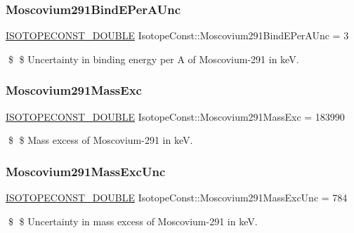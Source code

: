 \subsubsection{\texorpdfstring{Moscovium291\+Bind\+E\+Per\+A\+Unc}{Moscovium291BindEPerAUnc}}
{\footnotesize\ttfamily \mbox{\hyperlink{group___isotope_const-_macros_ga8f45a7272ce02c0b4c65c44636ed719a}{I\+S\+O\+T\+O\+P\+E\+C\+O\+N\+S\+T\+\_\+\+D\+O\+U\+B\+LE}} Isotope\+Const\+::\+Moscovium291\+Bind\+E\+Per\+A\+Unc = 3}

\$ \$ Uncertainty in binding energy per A of Moscovium-\/291 in keV. \mbox{\label{group___isotope_const-_moscovium-_mc291_ga5de9e2df6278844fd7f9e5b5e7cfc997}} 
\subsubsection{\texorpdfstring{Moscovium291\+Mass\+Exc}{Moscovium291MassExc}}
{\footnotesize\ttfamily \mbox{\hyperlink{group___isotope_const-_macros_ga8f45a7272ce02c0b4c65c44636ed719a}{I\+S\+O\+T\+O\+P\+E\+C\+O\+N\+S\+T\+\_\+\+D\+O\+U\+B\+LE}} Isotope\+Const\+::\+Moscovium291\+Mass\+Exc = 183990}

\$ \$ Mass excess of Moscovium-\/291 in keV. \mbox{\label{group___isotope_const-_moscovium-_mc291_ga3d97a3c2f9f0782c5a9455246d57619f}} 
\subsubsection{\texorpdfstring{Moscovium291\+Mass\+Exc\+Unc}{Moscovium291MassExcUnc}}
{\footnotesize\ttfamily \mbox{\hyperlink{group___isotope_const-_macros_ga8f45a7272ce02c0b4c65c44636ed719a}{I\+S\+O\+T\+O\+P\+E\+C\+O\+N\+S\+T\+\_\+\+D\+O\+U\+B\+LE}} Isotope\+Const\+::\+Moscovium291\+Mass\+Exc\+Unc = 784}

\$ \$ Uncertainty in mass excess of Moscovium-\/291 in keV. \mbox{\label{group___isotope_const-_moscovium-_mc291_ga5e536e7d088bb085023f94c952123bcd}} 
